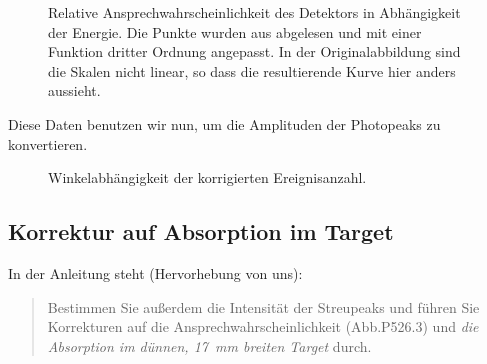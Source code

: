 \documentclass[11pt, ngerman, fleqn, DIV=15, headinclude, BCOR=2cm]{scrreprt}
\begin{document}
\begin{figure}[htbp]
    \centering
    \caption{%
        Relative Ansprechwahrscheinlichkeit des Detektors in Abhängigkeit der
        Energie. Die Punkte wurden aus
        \parencite[Abbildung~P526.3]{physik512-Anleitung} abgelesen und mit
        einer Funktion dritter Ordnung angepasst. In der Originalabbildung sind
        die Skalen nicht linear, so dass die resultierende Kurve hier anders
        aussieht.
    }
    \label{fig:Ansprech-fit}
\end{figure}

Diese Daten benutzen wir nun, um die Amplituden der Photopeaks zu konvertieren.

\begin{figure}[htbp]
    \centering
    \caption{%
        Winkelabhängigkeit der korrigierten Ereignisanzahl.
    }
    \label{fig:polar_korr}
\end{figure}

\subsection{Korrektur auf Absorption im Target}

In der Anleitung steht (Hervorhebung von uns):
\begin{quote}
    Bestimmen Sie außerdem die Intensität der Streupeaks und führen Sie
    Korrekturen auf die Ansprechwahrscheinlichkeit (Abb.P526.3) und \emph{die
    Absorption im dünnen, \SI{17}{\milli\meter} breiten Target} durch.
    \parencite[4]{physik512-Anleitung}
\end{quote}
\end{document}
